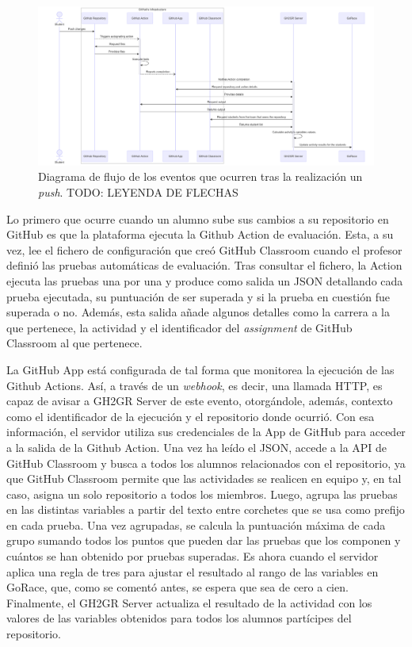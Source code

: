 \begin{figure}
    \centering
    \includegraphics[width=\linewidth]{images/flow-after-push.png}
    \caption{Diagrama de flujo de los eventos que ocurren tras la realización un \textit{push}. TODO: LEYENDA DE FLECHAS}
    \label{fig:enter-label}
\end{figure}

Lo primero que ocurre cuando un alumno sube sus cambios a su repositorio en GitHub es que la plataforma ejecuta la Github Action de evaluación. Esta, a su vez, lee el fichero de configuración que creó GitHub Classroom cuando el profesor definió las pruebas automáticas de evaluación. Tras consultar el fichero, la Action ejecuta las pruebas una por una y produce como salida un \acrshort{JSON} detallando cada prueba ejecutada, su puntuación de ser superada y si la prueba en cuestión fue superada o no. Además, esta salida añade algunos detalles como la carrera a la que pertenece, la actividad y el identificador del \textit{assignment} de GitHub Classroom al que pertenece.

La GitHub App está configurada de tal forma que monitorea la ejecución de las Github Actions. Así, a través de un \textit{webhook}, es decir, una llamada \acrshort{HTTP}, es capaz de avisar a GH2GR Server de este evento, otorgándole, además, contexto como el identificador de la ejecución y el repositorio donde ocurrió. Con esa información, el servidor utiliza sus credenciales de la App de GitHub para acceder a la salida de la Github Action. Una vez ha leído el \acrshort{JSON}, accede a la \acrshort{API} de GitHub Classroom y busca a todos los alumnos relacionados con el repositorio, ya que GitHub Classroom permite que las actividades se realicen en equipo y, en tal caso, asigna un solo repositorio a todos los miembros. Luego, agrupa las pruebas en las distintas variables a partir del texto entre corchetes que se usa como prefijo en cada prueba. Una vez agrupadas, se calcula la puntuación máxima de cada grupo sumando todos los puntos que pueden dar las pruebas que los componen y cuántos se han obtenido por pruebas superadas. Es ahora cuando el servidor aplica una regla de tres para ajustar el resultado al rango de las variables en GoRace, que, como se comentó antes, se espera que sea de cero a cien. Finalmente, el GH2GR Server actualiza el resultado de la actividad con los valores de las variables obtenidos para todos los alumnos partícipes del repositorio.

